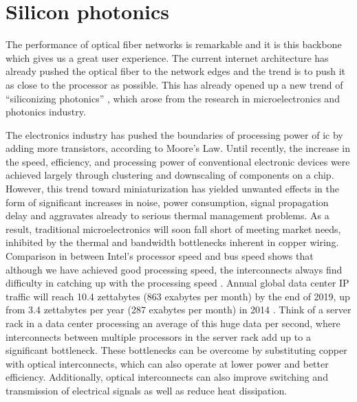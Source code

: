 \documentclass[../report.tex]{subfiles}
\begin{document}
	\section{Silicon photonics}
The performance of optical fiber networks is remarkable and it is this backbone which gives us a great user experience. The current internet architecture has already pushed the optical fiber to the network edges and the trend is to push it as close to the processor as possible. This has already opened up a new trend of “siliconizing photonics” \cite{silicon_photonics}, which arose from the research in microelectronics and photonics industry.\par 
The electronics industry has pushed the boundaries of processing power of \gls{ic} by adding more transistors, according to Moore’s Law. Until recently, the increase in the speed, efficiency, and processing power of conventional electronic devices were achieved largely through clustering and downscaling of components on a chip. However, this trend toward miniaturization has yielded unwanted effects in the form of significant increases in noise, power consumption, signal propagation delay and aggravates already to serious thermal management problems. As a result, traditional microelectronics will soon fall short of meeting market needs, inhibited by the thermal and bandwidth bottlenecks inherent in copper wiring. Comparison in between Intel's processor speed and bus speed shows that although we have achieved good processing speed, the interconnects always find difficulty in catching up with the processing speed \cite{intel_proc_compare}. Annual global data center IP traffic will reach 10.4 zettabytes (863 exabytes per month) by the end of 2019, up from 3.4 zettabytes per year (287 exabytes per month) in 2014 \cite{cisco_forecast_2019}. Think of a server rack in a data center processing an average of this huge data per second, where interconnects between multiple processors in the server rack add up to a significant bottleneck. These bottlenecks can be overcome by substituting copper with optical interconnects, which can also operate at lower power and better efficiency. Additionally, optical interconnects can also improve switching and transmission of electrical signals as well as reduce heat dissipation.\par
\end{document}
